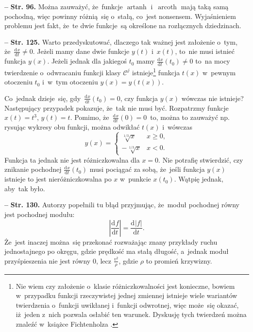 \documentclass[a4paper,11pt]{article}
\DeclareMathOperator{\artanh}{artanh}
\DeclareMathOperator{\arcoth}{arcoth}
\newcommand{\fr}{\frac}
\newcommand{\mc}{\mathcal}
\newcommand{\mr}{\mathrm}
\newcommand{\sq}{\sqrt}
\newcommand{\Cj}{\mc{C}^{ j }}
\newcommand{\de}{\mr{d}}
\newcommand{\dd}[3]{\fr{ \de^{ #1 } { #2 } }{ \de { #3 }^{ #1 } } }
\newcommand{\tb}{\textbf}
\newcommand{\noi}{\noindent}
\newcommand{\start}{\noi \tb{--} {}}
\newcommand{\Str}[1]{\tb{Str. #1.}}
\providecommand{\abs}[1]{\lvert #1 \rvert}
\begin{document}
\start \Str{96} Można zauważyć, że~funkcje $\artanh$ i~$\arcoth$ mają
taką samą pochodną, więc powinny różnią~się o~stałą, co~jest
nonsensem. Wyjaśnieniem problemu jest fakt, że~te dwie funkcje~są
określone na rozłącznych dziedzinach.

\start \Str{125} Warto przedyskutować, dlaczego tak ważnej jest
założenie o~tym, że~$\dd{}{ x }{ t } \neq 0$. Jeżeli mamy dane dwie
funkcje $y( t )$ i~$x( t )$, to~nie musi istnieć funkcja $y( x )$.
Jeżeli jednak dla jakiegoś $t_{ 0 }$ mamy
$\dd{}{ x }{ t }( t_{ 0 } ) \neq 0$ to~na mocy twierdzenie
o~odwracaniu funkcji klasy $\Cj$ istnieje\footnote{Nie wiem czy
  założenie o~klasie różniczkowalności jest konieczne, bowiem
  w~przypadku funkcji rzeczywistej jednej zmiennej istnieje wiele
  wariantów twierdzenia o~funkcji uwikłanej i~funkcji odwrotnej, więc
  może~się okazać, iż~jeden z~nich pozwala osłabić ten warunek.
  Dyskusję tych twierdzeń można znaleźć w~książce Fichtenholza
  \cite{Fic05a}.} funkcja $t( x )$ w~pewnym otoczeniu $t_{ 0 }$
i~w~tym otoczeniu $y( x ) = y( t( x ) )$.

Co~jednak dzieje~się, gdy~$\dd{}{ x }{ t }( t_{ 0 } ) = 0$, czy
funkcja $y( x )$ wówczas nie istnieje? Następujący przypadek pokazuje,
że~tak nie musi być. Rozpatrzmy funkcje $x( t ) = t^{ 3 }$,
$y( t ) = t$. Pomimo, że~$\dd{}{ x }{ t }( 0 ) = 0$~to, można to
zauważyć np. rysując wykresy obu funkcji, można odwikłać $t( x )$
i~wówczas
\begin{displaymath}
  y( x ) =
  \begin{cases}
    \sq[1 / 3]{ x } & x \geq 0, \\
    -\sq[1 / 3]{ x } & x < 0.
  \end{cases}
\end{displaymath}
Funkcja ta jednak nie jest różniczkowalna dla $x = 0$. Nie potrafię
stwierdzić, czy znikanie pochodnej $\dd{}{ x }{ t }( t_{ 0 } )$ musi
pociągać za sobą, że~jeśli funkcja $y( x )$ istnieje to jest
nieróżniczkowalna po $x$ w~punkcie $x( t_{ 0 } )$. Wątpię jednak,
aby~tak było.

\start \Str{130} Autorzy popełnili tu błąd przyjmując, że~moduł
pochodnej równy jest pochodnej modułu:
\begin{displaymath}
  \left| \dd{}{ f }{ t } \right| = \dd{}{ \abs{ f } }{ t }.
\end{displaymath}
Że~jest inaczej można~się przekonać rozważając znany przykłady ruchu
jednostajnego po okręgu, gdzie prędkość ma stałą długość, a~jednak
moduł przyśpieszenia nie jest równy 0, lecz $\fr{ v^{ 2 } }{ \rho }$,
gdzie $\rho$ to promień krzywizny.
\end{document}
